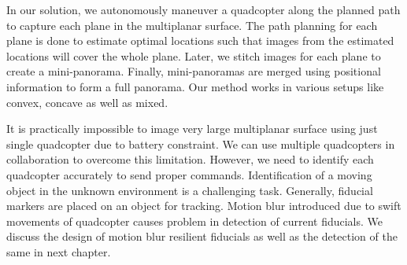 In our solution, we autonomously maneuver a quadcopter along the planned path to
capture each plane in the multiplanar surface. The path planning for each plane
is done to estimate optimal locations such that images from the estimated
locations will cover the whole plane. Later, we stitch images for each plane to create a mini-panorama.
Finally, mini-panoramas are merged using positional information to form a full panorama.
Our method works in various setups like convex, concave as well as mixed.

It is practically impossible to image very large multiplanar surface using
just single quadcopter due to battery constraint. We can use multiple
quadcopters in collaboration to overcome this limitation. However, we need to
identify each quadcopter accurately to send proper commands. Identification of
a moving object in the unknown environment is a challenging task. Generally, 
fiducial markers are placed on an object for tracking. Motion blur introduced
due to swift movements of quadcopter causes problem in detection of current
fiducials. We discuss the design of motion blur resilient fiducials as well as
the detection of the same in next chapter.
